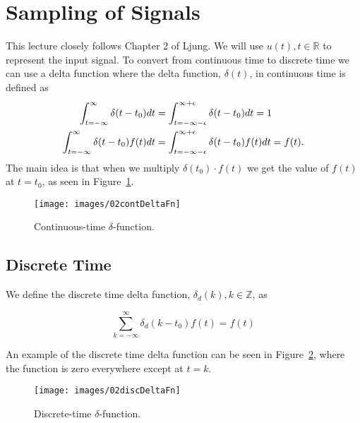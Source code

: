 \mainmatter%
\setcounter{page}{1}

\lectureseries[\course]{\course}

\date{September 29, 2009}

\setaddress%

\setcounter{lecture}{1}
\setcounter{chapter}{1}


\section{Sampling of Signals}
This lecture closely follows Chapter 2 of Ljung.
We will use $u(t), t \in \mathbb{R}$ to represent the input signal.
To convert from continuous time to discrete time we can use a delta function where the delta function, $\delta (t)$, in continuous time is defined as
\begin{align*}
\int_{t=-\infty}^\infty \delta(t-t_0)dt &= \int_{t=-\infty-\epsilon}^{\infty+\epsilon} \delta(t-t_0)dt = 1 \\
\int_{t=-\infty}^\infty \delta(t-t_0)f(t)dt &= \int_{t=-\infty-\epsilon}^{\infty+\epsilon} \delta(t-t_0)f(t)dt = f(t).
\end{align*}
The main idea is that when we multiply $\delta(t_0) \cdot f(t)$ we get the value of $f(t)$ at $t=t_0$, as seen in Figure~\ref{fig:02contDeltaFn}.
\begin{figure}[ht!]
\centering
\texttt{[image: images/02contDeltaFn]}
\caption{Continuous-time $\delta$-function.}%
\label{fig:02contDeltaFn}
\end{figure}

\subsection{Discrete Time}
We define the discrete time delta function, $\delta_d(k), k \in \mathbb{Z}$, as

\begin{equation*}
\sum_{k=-\infty}^\infty \delta_d(k-t_0)f(t) = f(t)
\end{equation*}

An example of the discrete time delta function can be seen in Figure~\ref{fig:02discDeltaFn}, where the function is zero everywhere except at $t=k$.
\begin{figure}[ht!]
\centering
\texttt{[image: images/02discDeltaFn]}
\caption{Discrete-time $\delta$-function.}%
\label{fig:02discDeltaFn}
\end{figure}

